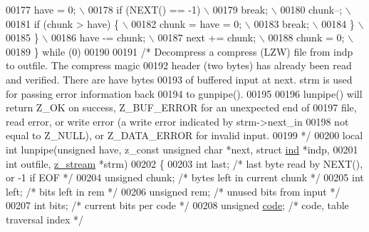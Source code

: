 \begin{DoxyCode}
00177 \textcolor{preprocessor}{            have = 0; \(\backslash\)}
00178 \textcolor{preprocessor}{            if (NEXT() == -1) \(\backslash\)}
00179 \textcolor{preprocessor}{                break; \(\backslash\)}
00180 \textcolor{preprocessor}{            chunk--; \(\backslash\)}
00181 \textcolor{preprocessor}{            if (chunk > have) \{ \(\backslash\)}
00182 \textcolor{preprocessor}{                chunk = have = 0; \(\backslash\)}
00183 \textcolor{preprocessor}{                break; \(\backslash\)}
00184 \textcolor{preprocessor}{            \} \(\backslash\)}
00185 \textcolor{preprocessor}{        \} \(\backslash\)}
00186 \textcolor{preprocessor}{        have -= chunk; \(\backslash\)}
00187 \textcolor{preprocessor}{        next += chunk; \(\backslash\)}
00188 \textcolor{preprocessor}{        chunk = 0; \(\backslash\)}
00189 \textcolor{preprocessor}{    \} while (0)}
00190 
00191 \textcolor{comment}{/* Decompress a compress (LZW) file from indp to outfile.  The compress magic}
00192 \textcolor{comment}{   header (two bytes) has already been read and verified.  There are have bytes}
00193 \textcolor{comment}{   of buffered input at next.  strm is used for passing error information back}
00194 \textcolor{comment}{   to gunpipe().}
00195 \textcolor{comment}{}
00196 \textcolor{comment}{   lunpipe() will return Z\_OK on success, Z\_BUF\_ERROR for an unexpected end of}
00197 \textcolor{comment}{   file, read error, or write error (a write error indicated by strm->next\_in}
00198 \textcolor{comment}{   not equal to Z\_NULL), or Z\_DATA\_ERROR for invalid input.}
00199 \textcolor{comment}{ */}
00200 local \textcolor{keywordtype}{int} lunpipe(\textcolor{keywordtype}{unsigned} have, z\_const \textcolor{keywordtype}{unsigned} \textcolor{keywordtype}{char} *next, \textcolor{keyword}{struct} \hyperlink{structind}{ind} *indp,
00201                   \textcolor{keywordtype}{int} outfile, \hyperlink{structz__stream__s}{z\_stream} *strm)
00202 \{
00203     \textcolor{keywordtype}{int} last;                   \textcolor{comment}{/* last byte read by NEXT(), or -1 if EOF */}
00204     \textcolor{keywordtype}{unsigned} chunk;             \textcolor{comment}{/* bytes left in current chunk */}
00205     \textcolor{keywordtype}{int} left;                   \textcolor{comment}{/* bits left in rem */}
00206     \textcolor{keywordtype}{unsigned} rem;               \textcolor{comment}{/* unused bits from input */}
00207     \textcolor{keywordtype}{int} bits;                   \textcolor{comment}{/* current bits per code */}
00208     \textcolor{keywordtype}{unsigned} \hyperlink{structcode}{code};              \textcolor{comment}{/* code, table traversal index */}

\end{DoxyCode}
